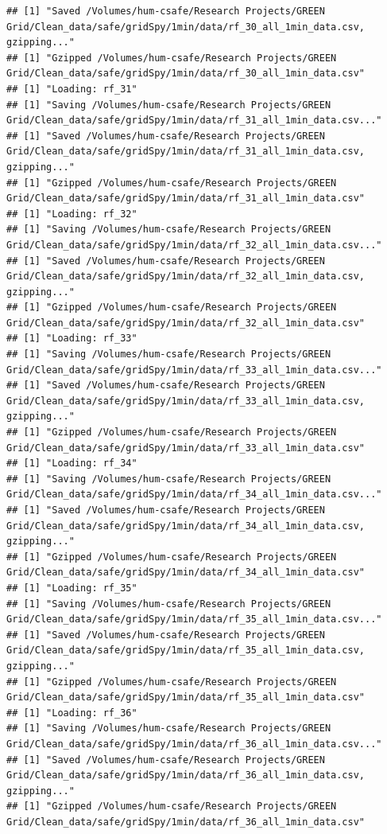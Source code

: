 \documentclass[]{article}
\begin{document}
\begin{verbatim}
## [1] "Saved /Volumes/hum-csafe/Research Projects/GREEN Grid/Clean_data/safe/gridSpy/1min/data/rf_30_all_1min_data.csv, gzipping..."
## [1] "Gzipped /Volumes/hum-csafe/Research Projects/GREEN Grid/Clean_data/safe/gridSpy/1min/data/rf_30_all_1min_data.csv"
## [1] "Loading: rf_31"
## [1] "Saving /Volumes/hum-csafe/Research Projects/GREEN Grid/Clean_data/safe/gridSpy/1min/data/rf_31_all_1min_data.csv..."
## [1] "Saved /Volumes/hum-csafe/Research Projects/GREEN Grid/Clean_data/safe/gridSpy/1min/data/rf_31_all_1min_data.csv, gzipping..."
## [1] "Gzipped /Volumes/hum-csafe/Research Projects/GREEN Grid/Clean_data/safe/gridSpy/1min/data/rf_31_all_1min_data.csv"
## [1] "Loading: rf_32"
## [1] "Saving /Volumes/hum-csafe/Research Projects/GREEN Grid/Clean_data/safe/gridSpy/1min/data/rf_32_all_1min_data.csv..."
## [1] "Saved /Volumes/hum-csafe/Research Projects/GREEN Grid/Clean_data/safe/gridSpy/1min/data/rf_32_all_1min_data.csv, gzipping..."
## [1] "Gzipped /Volumes/hum-csafe/Research Projects/GREEN Grid/Clean_data/safe/gridSpy/1min/data/rf_32_all_1min_data.csv"
## [1] "Loading: rf_33"
## [1] "Saving /Volumes/hum-csafe/Research Projects/GREEN Grid/Clean_data/safe/gridSpy/1min/data/rf_33_all_1min_data.csv..."
## [1] "Saved /Volumes/hum-csafe/Research Projects/GREEN Grid/Clean_data/safe/gridSpy/1min/data/rf_33_all_1min_data.csv, gzipping..."
## [1] "Gzipped /Volumes/hum-csafe/Research Projects/GREEN Grid/Clean_data/safe/gridSpy/1min/data/rf_33_all_1min_data.csv"
## [1] "Loading: rf_34"
## [1] "Saving /Volumes/hum-csafe/Research Projects/GREEN Grid/Clean_data/safe/gridSpy/1min/data/rf_34_all_1min_data.csv..."
## [1] "Saved /Volumes/hum-csafe/Research Projects/GREEN Grid/Clean_data/safe/gridSpy/1min/data/rf_34_all_1min_data.csv, gzipping..."
## [1] "Gzipped /Volumes/hum-csafe/Research Projects/GREEN Grid/Clean_data/safe/gridSpy/1min/data/rf_34_all_1min_data.csv"
## [1] "Loading: rf_35"
## [1] "Saving /Volumes/hum-csafe/Research Projects/GREEN Grid/Clean_data/safe/gridSpy/1min/data/rf_35_all_1min_data.csv..."
## [1] "Saved /Volumes/hum-csafe/Research Projects/GREEN Grid/Clean_data/safe/gridSpy/1min/data/rf_35_all_1min_data.csv, gzipping..."
## [1] "Gzipped /Volumes/hum-csafe/Research Projects/GREEN Grid/Clean_data/safe/gridSpy/1min/data/rf_35_all_1min_data.csv"
## [1] "Loading: rf_36"
## [1] "Saving /Volumes/hum-csafe/Research Projects/GREEN Grid/Clean_data/safe/gridSpy/1min/data/rf_36_all_1min_data.csv..."
## [1] "Saved /Volumes/hum-csafe/Research Projects/GREEN Grid/Clean_data/safe/gridSpy/1min/data/rf_36_all_1min_data.csv, gzipping..."
## [1] "Gzipped /Volumes/hum-csafe/Research Projects/GREEN Grid/Clean_data/safe/gridSpy/1min/data/rf_36_all_1min_data.csv"

\end{verbatim}
\end{document}
